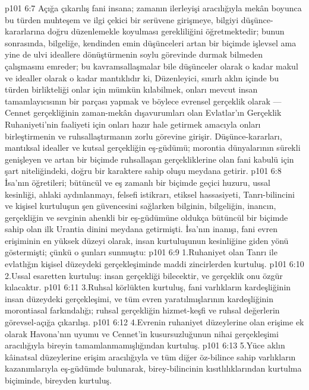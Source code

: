 \vs p101 6:7 Açığa çıkarılış fani insana; zamanın ilerleyişi aracılığıyla mekân boyunca bu türden muhteşem ve ilgi çekici bir serüvene girişmeye, bilgiyi düşünce\hyp{}kararlarına doğru düzenlemekle koyulması gerekliliğini öğretmektedir; bunun sonrasında, bilgeliğe, kendinden emin düşünceleri artan bir biçimde işlevsel ama yine de ulvi ideallere dönüştürmenin soylu görevinde durmak bilmeden çalışmasını emreder; bu kavramsallaşmalar bile düşünceler olarak o kadar makul ve idealler olarak o kadar mantıklıdır ki, Düzenleyici, sınırlı aklın içinde bu türden birlikteliği onlar için mümkün kılabilmek, onları mevcut insan tamamlayıcısının bir parçası yapmak ve böylece evrensel gerçeklik olarak --- Cennet gerçekliğinin zaman\hyp{}mekân dışavurumları olan Evlatlar’ın Gerçeklik Ruhaniyeti’nin faaliyeti için onları hazır hale getirmek amacıyla onları birleştirmenin ve ruhsallaştırmanın zorlu görevine girişir. Düşünce\hyp{}kararları, mantıksal idealler ve kutsal gerçekliğin eş\hyp{}güdümü; morontia dünyalarının sürekli genişleyen ve artan bir biçimde ruhsallaşan gerçekliklerine olan fani kabulü için şart niteliğindeki, doğru bir karaktere sahip oluşu meydana getirir.
\vs p101 6:8 İsa’nın öğretileri; bütüncül ve eş zamanlı bir biçimde geçici huzuru, ussal kesinliği, ahlaki aydınlanmayı, felsefi istikrarı, etiksel hassasiyeti, Tanrı\hyp{}bilincini ve kişisel kurtuluşun şen güvencesini sağlarken bilginin, bilgeliğin, inancın, gerçekliğin ve sevginin ahenkli bir eş\hyp{}güdümüne oldukça bütüncül bir biçimde sahip olan ilk Urantia dinini meydana getirmişti. İsa’nın inanışı, fani evren erişiminin en yüksek düzeyi olarak, insan kurtuluşunun kesinliğine giden yönü göstermişti; çünkü o şunları sunmuştu:
\vs p101 6:9 1.\bibnobreakspace Ruhaniyet olan Tanrı ile evlatlığın kişisel düzeydeki gerçekleşiminde maddi zincirlerden kurtuluş.
\vs p101 6:10 2.\bibnobreakspace Ussal esaretten kurtuluş: insan gerçekliği bilecektir, ve gerçeklik onu özgür kılacaktır.
\vs p101 6:11 3.\bibnobreakspace Ruhsal körlükten kurtuluş, fani varlıkların kardeşliğinin insan düzeydeki gerçekleşimi, ve tüm evren yaratılmışlarının kardeşliğinin morontiasal farkındalığı; ruhsal gerçekliğin hizmet\hyp{}keşfi ve ruhsal değerlerin görevsel\hyp{}açığa çıkarılışı.
\vs p101 6:12 4.\bibnobreakspace Evrenin ruhaniyet düzeylerine olan erişime ek olarak Havona’nın uyumu ve Cennet’in kusursuzluğunun nihai gerçekleşimi aracılığıyla bireyin tamamlanmamışlığından kurtuluş.
\vs p101 6:13 5.\bibnobreakspace Yüce aklın kâinatsal düzeylerine erişim aracılığıyla ve tüm diğer öz\hyp{}bilince sahip varlıkların kazanımlarıyla eş\hyp{}güdümde bulunarak, birey\hyp{}bilincinin kısıtlılıklarından kurtulma biçiminde, bireyden kurtuluş.
